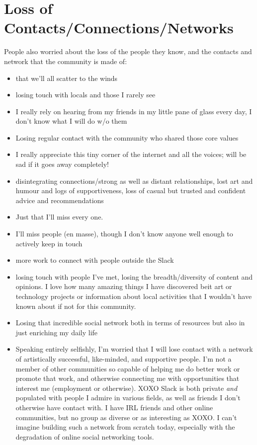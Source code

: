 \documentclass[
]{book}
\providecommand{\tightlist}{%
  \setlength{\itemsep}{0pt}\setlength{\parskip}{0pt}}
\begin{document}
\section{Loss of Contacts/Connections/Networks}\label{loss-of-contactsconnectionsnetworks}

People also worried about the loss of the people they know, and the contacts and network that the community is made of:

\begin{itemize}
\tightlist
\item
  that we'll all scatter to the winds
\item
  losing touch with locals and those I rarely see
\item
  I really rely on hearing from my friends in my little pane of glass every day, I don't know what I will do w/o them
\item
  Losing regular contact with the community who shared those core values
\item
  I really appreciate this tiny corner of the internet and all the voices; will be sad if it goes away completely!
\item
  disintegrating connections/strong as well as distant relationships, lost art and humour and logs of supportiveness, loss of casual but trusted and confident advice and recommendations
\item
  Just that I'll miss every one.
\item
  I'll miss people (en masse), though I don't know anyone well enough to actively keep in touch
\item
  more work to connect with people outside the Slack
\item
  losing touch with people I've met, losing the breadth/diversity of content and opinions. I love how many amazing things I have discovered beit art or technology projects or information about local activities that I wouldn't have known about if not for this community.
\item
  Losing that incredible social network both in terms of resources but also in just enriching my daily life
\item
  Speaking entirely selfishly, I'm worried that I will lose contact with a network of artistically successful, like-minded, and supportive people. I'm not a member of other communities so capable of helping me do better work or promote that work, and otherwise connecting me with opportunities that interest me (employment or otherwise). XOXO Slack is both private \emph{and} populated with people I admire in various fields, as well as friends I don't otherwise have contact with. I have IRL friends and other online communities, but no group as diverse or as interesting as XOXO. I can't imagine building such a network from scratch today, especially with the degradation of online social networking tools.

\end{itemize}
\end{document}
